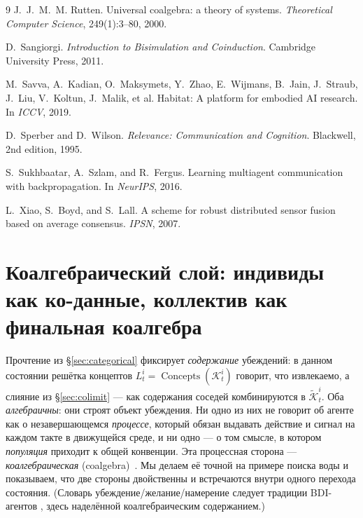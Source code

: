 \documentclass{article}
\begin{document}
{\begin{thebibliography}{9}
J.~J.~M.~M. Rutten.
\newblock Universal coalgebra: a theory of systems.
\newblock \emph{Theoretical Computer Science}, 249(1):3--80, 2000.

D.~Sangiorgi.
\newblock \emph{Introduction to Bisimulation and Coinduction}.
\newblock Cambridge University Press, 2011.

M.~Savva, A.~Kadian, O.~Maksymets, Y.~Zhao, E.~Wijmans, B.~Jain, J.~Straub, J.~Liu, V.~Koltun, J.~Malik, et al.
\newblock Habitat: A platform for embodied AI research.
\newblock In \emph{ICCV}, 2019.

D.~Sperber and D.~Wilson.
\newblock \emph{Relevance: Communication and Cognition}.
\newblock Blackwell, 2nd edition, 1995.

S.~Sukhbaatar, A.~Szlam, and R.~Fergus.
\newblock Learning multiagent communication with backpropagation.
\newblock In \emph{NeurIPS}, 2016.

L.~Xiao, S.~Boyd, and S.~Lall.
\newblock A scheme for robust distributed sensor fusion based on average consensus.
\newblock \emph{IPSN}, 2007.

\end{thebibliography}
}

\appendix

\section{Коалгебраический слой: индивиды как ко-данные, коллектив как финальная коалгебра}
\label{sec:coalgebra}

Прочтение из \S\ref{sec:categorical} фиксирует \emph{содержание}
убеждений: в данном состоянии решётка концептов
$L_t^i=\operatorname{Concepts}(\mathcal{K}_t^i)$ говорит, что извлекаемо,
а слияние из \S\ref{sec:colimit} --- как содержания соседей комбинируются
в $\widetilde{\mathcal K}_t^i$. Оба \emph{алгебраичны}: они строят объект
убеждения. Ни одно из них не говорит об агенте как о незавершающемся
\emph{процессе}, который обязан выдавать действие и сигнал на каждом
такте в движущейся среде, и ни одно --- о том смысле, в котором
\emph{популяция} приходит к общей конвенции. Эта процессная сторона ---
\emph{коалгебраическая} (coalgebra)~\citep{rutten2000universal,jacobs2016coalgebra}.
Мы делаем её точной на примере поиска воды и показываем, что две стороны
двойственны и встречаются внутри одного перехода состояния. (Словарь
убеждение/желание/намерение следует традиции BDI-агентов
\citep{rao1995bdi}, здесь наделённой коалгебраическим содержанием.)
\end{document}
